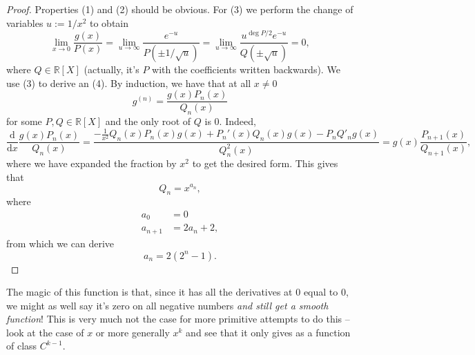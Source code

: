 \begin{proof}
    Properties (1) and (2) should be obvious. For (3) we perform the change of variables \( u := 1/x^2 \) to obtain
    \[ 
        \lim\limits_{x \to 0} \frac{g(x)}{P(x)} = \lim\limits_{u \to \infty} \frac{e^{-u}}{P(\pm 1/\sqrt{u})} = \lim\limits_{u \to \infty}\frac{u^{\deg P / 2} e^{-u}}{Q(\pm\sqrt{u})} = 0,
   \]
   where \( Q \in \mathbb{R}[X] \) (actually, it's \( P \) with the coefficients written backwards). We use (3) to derive an (4). By induction, we have that at all \( x \neq 0 \)
   \[ 
       g^{(n)} = \frac{g(x)P_n(x)}{Q_n(x)} 
  \]
  for some \( P, Q \in \mathbb{R}[X] \) and the only root of \( Q \) is \( 0 \). Indeed,
  \[ 
      \frac{\mathrm{d}}{\mathrm{d}x}  \frac{g(x)P_n(x)}{Q_n(x)} = \frac{ -\frac{1}{x^2}Q_n(x)P_n(x)g(x) + P_n'(x)Q_n(x)g(x) - P_nQ'_n g(x) }{Q^2_n(x)} = g(x) \frac{P_{n+1}(x)}{Q_{n+1}(x)},
 \]
where we have expanded the fraction by \( x^2 \) to get the desired form. This gives that
 \[ 
     Q_n = x^{a_n},
\]
where
\begin{align*}
    a_0 &= 0 \\
    a_{n+1} &= 2a_n + 2,
\end{align*}
from which we can derive
\[ 
    a_n = 2(2^n - 1). 
\]
\end{proof}

The magic of this function is that, since it has all the derivatives at \( 0 \) equal to \( 0 \), we might as well say it's zero on all negative numbers \emph{and still get a smooth function}! This is very much not the case for more primitive attempts to do this -- look at the case of \( x \) or more generally \( x^k \) and see that it only gives as a function of class \( C^{k-1} \).


